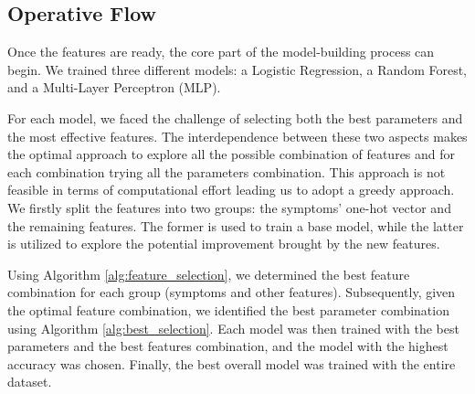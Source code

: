 
\subsection{Operative Flow}

Once the features are ready, the core part of the model-building process can begin. 
We trained three different models: a Logistic Regression, a Random Forest, and a Multi-Layer Perceptron (MLP).

For each model, we faced the challenge of selecting both the best parameters and the most effective features. 
The interdependence between these two aspects makes the optimal approach to explore all the possible combination of features
and for each combination trying all the parameters combination. This approach is not feasible in terms of computational effort
leading us to adopt a greedy approach. We firstly split the features into two 
groups: the symptoms' one-hot vector and the remaining features. The former is used to train a base model, 
while the latter is utilized to explore the potential improvement brought by the new features.

Using Algorithm \ref{alg:feature_selection}, we determined the best feature combination for each group (symptoms and other features).
Subsequently, given the optimal feature combination, we identified the best parameter combination using Algorithm 
\ref{alg:best_selection}. Each model was then trained with the best parameters and the best features combination, 
and the model with the highest accuracy was chosen. Finally, the best overall model was trained with the entire dataset.


